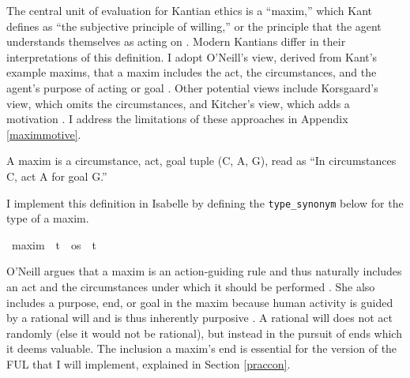 \begin{isabellebody}
\begin{isamarkuptext}
The central unit of evaluation for Kantian ethics is a ``maxim,'' which Kant defines as ``the subjective 
principle of willing,'' or the principle that the agent understands themselves as acting on \citep[16, footnote 1]{groundwork}. 
Modern Kantians differ in their interpretations of this definition. I adopt O'Neill's view, derived from 
Kant's example maxims, that a maxim includes the act, the circumstances, and the agent's purpose of 
acting or goal \citep{actingonprinciple}. Other potential views include Korsgaard's view, which omits 
the circumstances, and Kitcher's view, which adds a motivation \citep{actingforareason, kitcher}. I 
address the limitations of these approaches in Appendix \ref{maximmotive}.


\begin{definition}[Maxim]
    A maxim is a circumstance, act, goal tuple (C, A, G), read as ``In circumstances C, act A for goal G.''
\end{definition}

I implement this definition in Isabelle by defining the \texttt{type\_synonym} below for the type
of a maxim.%
\end{isamarkuptext}\isamarkuptrue%
\isamarkupfalse%
\ maxim\ {\isacharequal}\ {\isachardoublequoteopen}{\isacharparenleft}t\ {\isacharasterisk}\ os\ {\isacharasterisk}\ t{\isacharparenright}{\isachardoublequoteclose}\isanewline
%
%
\begin{isamarkuptext}%
O'Neill argues that a maxim 
is an action-guiding rule and thus naturally includes an act and the circumstances under which 
it should be performed \citep[37]{actingonprinciple}. 
She also includes a purpose, end, or goal in the maxim because human activity is guided by a rational will
and is thus inherently purposive \citep[40]{groundwork}. A rational will does not act randomly (else it would not be rational), 
but instead in the pursuit of ends which it deems valuable. The inclusion a maxim's end is essential 
for the version of the FUL that I will implement, explained in Section \ref{praccon}.


\end{isamarkuptext}
\end{isabellebody}
